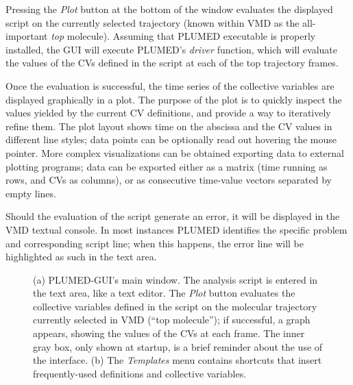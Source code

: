 \documentclass[preprint,review,11pt]{elsarticle}
\begin{document}
Pressing the \emph{Plot} button at the bottom of the window evaluates
the displayed script on the currently selected trajectory (known
within VMD as the all-important \emph{top} molecule). Assuming that
PLUMED executable is properly installed, the GUI will execute PLUMED's
\emph{driver} function, which will evaluate the values of the CVs
defined in the script at each of the top trajectory frames.

Once the evaluation is successful, the time series of the collective
variables are displayed graphically in a plot.  The purpose of the
plot is to quickly inspect the values yielded by the current CV
definitions, and provide a way to iteratively refine them. The plot
layout  shows time on the abscissa and the CV values in
different line styles; data points can be optionally read out hovering the
mouse pointer.  More complex visualizations can be obtained exporting
data to external plotting programs; data can be exported 
either as a matrix (time running as rows, and CVs as
columns), or as consecutive time-value vectors separated by empty
lines.

Should the evaluation of the script generate an error, it will be
displayed in the VMD textual console.  In most instances PLUMED
identifies the specific problem and corresponding script line; when
this happens, the error line will be highlighted as such in the text area.



\begin{figure}
  \centering
  \caption{(a) PLUMED-GUI's main window.  The analysis script is
    entered in the text area, like a text editor. The \emph{Plot}
    button evaluates the collective variables defined in the script on
    the molecular trajectory currently selected in VMD (``top
    molecule''); if successful, a graph appears, showing the values of
    the CVs at each frame. The inner gray box, only shown at
    startup, is a brief reminder about the use of the interface. (b)
    The \emph{Templates} menu contains shortcuts that insert
    frequently-used definitions and collective variables. }
\end{figure}


\end{document}
